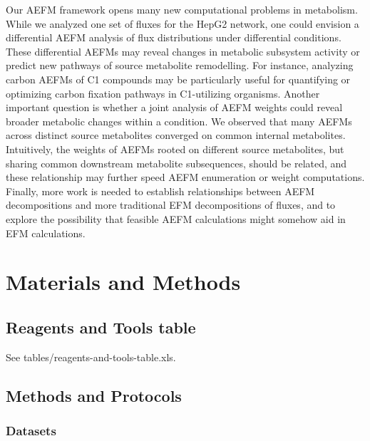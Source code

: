 \documentclass[12pt]{article}
\begin{document}
Our AEFM framework opens many new computational problems in metabolism.
While we analyzed one set of fluxes for the HepG2 network, one could
envision a differential AEFM analysis of flux distributions under
differential conditions. These differential AEFMs may reveal changes in
metabolic subsystem activity or predict new pathways of source metabolite
remodelling. For instance, analyzing carbon AEFMs of C1 compounds may be
particularly useful for quantifying or optimizing carbon fixation pathways
in C1-utilizing organisms. Another important question is whether a joint
analysis of AEFM weights could reveal broader metabolic changes
within a condition.
We observed that many AEFMs across distinct source
metabolites converged on common internal metabolites. 
Intuitively, the weights of AEFMs rooted on different source metabolites, but sharing common downstream metabolite subsequences,
should be related, and these relationship may further speed AEFM enumeration or weight computations.
Finally, more work is needed to establish relationships between AEFM decompositions and more traditional EFM decompositions of fluxes, and to explore the possibility that feasible AEFM calculations might somehow aid in EFM calculations.


\section*{Materials and Methods}

\subsection*{Reagents and Tools table}

See tables/reagents-and-tools-table.xls.

\subsection*{Methods and Protocols}

\subsubsection*{Datasets}
\end{document}
